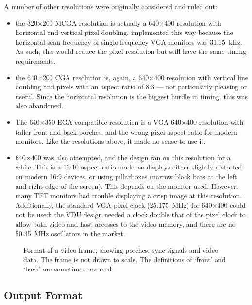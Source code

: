 A number of other resolutions were originally considered and ruled out:

\begin{itemize}
\item the 320×200 MCGA resolution is actually a 640×400 resolution with
  horizontal and vertical pixel doubling, implemented this way because the
  horizontal scan frequency of single-frequency VGA monitors was 31.15~kHz. As
  such, this would reduce the pixel resolution but still have the same timing
  requirements.
\item the 640×200 CGA resolution is, again, a 640×400 resolution with vertical
  line doubling and pixels with an aspect ratio of 8:3 — not particularly
  pleasing or useful. Since the horizontal resolution is the biggest hurdle in
  timing, this was also abandoned.
\item The 640×350 EGA-compatible resolution is a VGA 640×400 resolution with taller front
  and back porches, and the wrong pixel aspect ratio for modern monitors. Like
  the resolutions above, it made no sense to use it.
\item 640×400 was also attempted, and the design ran on this resolution for a
  while.  This is a 16:10 aspect ratio mode, so displays either slightly
  distorted on modern 16:9 devices, or using pillarboxes (narrow black bars at
  the left and right edge of the screen). This depends on the monitor
  used. However, many TFT monitors had trouble displaying a crisp image at this
  resolution. Additionally, the standard VGA pixel clock (25.175~MHz) for
  640×400 could not be used: the VDU design needed a clock double that of the
  pixel clock to allow both video and host accesses to the video memory, and
  there are no 50.35~MHz oscillators in the market.
\end{itemize}



\begin{figure}
 \centering     
 \caption[Video frame format]{\label{fig:video-frame-format} Format of a video
   frame, showing porches, sync signals and video data. The frame is not drawn
   to scale. The definitions of ‘front’ and ‘back’ are sometimes reversed.}
\end{figure}



\subsection{Output Format}

